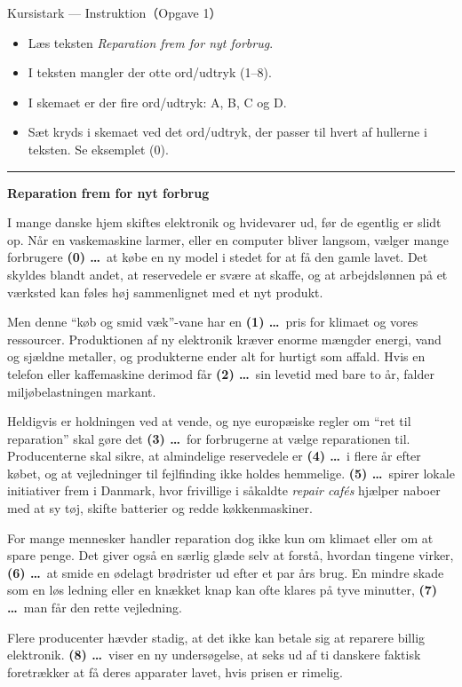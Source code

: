 \begin{emailbox}{Kursistark --- Instruktion（Opgave 1）}
\begin{itemize}
  \item Læs teksten \textit{Reparation frem for nyt forbrug}.
  \item I teksten mangler der otte ord/udtryk (1--8).
  \item I skemaet er der fire ord/udtryk: A, B, C og D.
  \item Sæt kryds i skemaet ved det ord/udtryk, der passer til hvert af hullerne i teksten. Se eksemplet (0).
\end{itemize}

\vspace{0.35em}
\hrule
\vspace{0.45em}

\textbf{\color{NCDNavy}Reparation frem for nyt forbrug}

\vspace{0.3em}
I mange danske hjem skiftes elektronik og hvidevarer ud, før de egentlig er slidt op. Når en vaskemaskine larmer, eller en computer bliver langsom, vælger mange forbrugere \textbf{(0) \dots}\ at købe en ny model i stedet for at få den gamle lavet. Det skyldes blandt andet, at reservedele er svære at skaffe, og at arbejdslønnen på et værksted kan føles høj sammenlignet med et nyt produkt.

\vspace{0.25em}
Men denne “køb og smid væk”-vane har en \textbf{(1) \dots}\ pris for klimaet og vores ressourcer. Produktionen af ny elektronik kræver enorme mængder energi, vand og sjældne metaller, og produkterne ender alt for hurtigt som affald. Hvis en telefon eller kaffemaskine derimod får \textbf{(2) \dots}\ sin levetid med bare to år, falder miljøbelastningen markant.

\vspace{0.25em}
Heldigvis er holdningen ved at vende, og nye europæiske regler om “ret til reparation” skal gøre det \textbf{(3) \dots}\ for forbrugerne at vælge reparationen til. Producenterne skal sikre, at almindelige reservedele er \textbf{(4) \dots}\ i flere år efter købet, og at vejledninger til fejlfinding ikke holdes hemmelige. \textbf{(5) \dots}\ spirer lokale initiativer frem i Danmark, hvor frivillige i såkaldte \textit{repair cafés} hjælper naboer med at sy tøj, skifte batterier og redde køkkenmaskiner.

\vspace{0.25em}
For mange mennesker handler reparation dog ikke kun om klimaet eller om at spare penge. Det giver også en særlig glæde selv at forstå, hvordan tingene virker, \textbf{(6) \dots}\ at smide en ødelagt brødrister ud efter et par års brug. En mindre skade som en løs ledning eller en knækket knap kan ofte klares på tyve minutter, \textbf{(7) \dots}\ man får den rette vejledning.

\vspace{0.25em}
Flere producenter hævder stadig, at det ikke kan betale sig at reparere billig elektronik. \textbf{(8) \dots}\ viser en ny undersøgelse, at seks ud af ti danskere faktisk foretrækker at få deres apparater lavet, hvis prisen er rimelig.
\end{emailbox}

